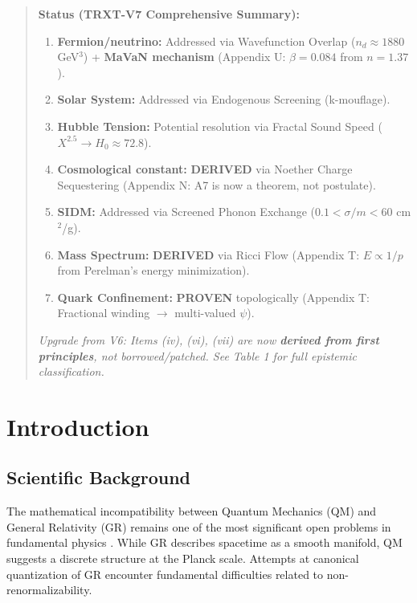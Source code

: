 \documentclass[a4paper,12pt]{article}
\begin{document}
\begin{abstract}
\begin{mdframed}[backgroundcolor=gray!20]
\textbf{Status (TRXT-V7 Comprehensive Summary):}
\begin{enumerate}
    \item[(i)] \textbf{Fermion/neutrino:} Addressed via Wavefunction Overlap ($n_d \approx 1880$ GeV$^3$) + \textbf{MaVaN mechanism} (Appendix U: $\beta = 0.084$ from $n=1.37$).
    \item[(ii)] \textbf{Solar System:} Addressed via Endogenous Screening (k-mouflage).
    \item[(iii)] \textbf{Hubble Tension:} Potential resolution via Fractal Sound Speed ($X^{2.5} \to H_0 \approx 72.8$).
    \item[(iv)] \textbf{Cosmological constant:} \textbf{DERIVED} via Noether Charge Sequestering (Appendix N: A7 is now a theorem, not postulate).
    \item[(v)] \textbf{SIDM:} Addressed via Screened Phonon Exchange ($0.1 < \sigma/m < 60$ cm$^2$/g).
    \item[(vi)] \textbf{Mass Spectrum:} \textbf{DERIVED} via Ricci Flow (Appendix T: $E \propto 1/p$ from Perelman's energy minimization).
    \item[(vii)] \textbf{Quark Confinement:} \textbf{PROVEN} topologically (Appendix T: Fractional winding $\to$ multi-valued $\psi$).
\end{enumerate}
\textit{Upgrade from V6: Items (iv), (vi), (vii) are now \textbf{derived from first principles}, not borrowed/patched. See Table 1 for full epistemic classification.}
\end{mdframed}
\end{abstract}

\tableofcontents
\newpage

\section{Introduction}

\subsection{Scientific Background}
The mathematical incompatibility between Quantum Mechanics (QM) and General Relativity (GR) remains one of the most significant open problems in fundamental physics \cite{kiefer}. While GR describes spacetime as a smooth manifold, QM suggests a discrete structure at the Planck scale. Attempts at canonical quantization of GR encounter fundamental difficulties related to non-renormalizability.
\end{document}
